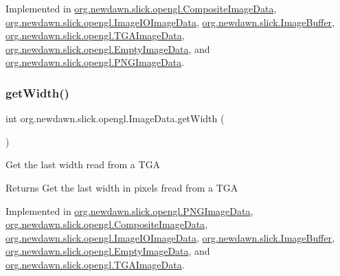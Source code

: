 Implemented in \mbox{\hyperlink{classorg_1_1newdawn_1_1slick_1_1opengl_1_1_composite_image_data_aa669973b504de478c91db03a0319b389}{org.\+newdawn.\+slick.\+opengl.\+Composite\+Image\+Data}}, \mbox{\hyperlink{classorg_1_1newdawn_1_1slick_1_1opengl_1_1_image_i_o_image_data_a54f08b337deb652cedaad3fe8dbe68da}{org.\+newdawn.\+slick.\+opengl.\+Image\+I\+O\+Image\+Data}}, \mbox{\hyperlink{classorg_1_1newdawn_1_1slick_1_1_image_buffer_a9691609c6c7e7776882af57cfd6daab9}{org.\+newdawn.\+slick.\+Image\+Buffer}}, \mbox{\hyperlink{classorg_1_1newdawn_1_1slick_1_1opengl_1_1_t_g_a_image_data_a4e4b19e2ec7982442fc5086cbf7f3a30}{org.\+newdawn.\+slick.\+opengl.\+T\+G\+A\+Image\+Data}}, \mbox{\hyperlink{classorg_1_1newdawn_1_1slick_1_1opengl_1_1_empty_image_data_ad261b00a724191075cff314442c14baa}{org.\+newdawn.\+slick.\+opengl.\+Empty\+Image\+Data}}, and \mbox{\hyperlink{classorg_1_1newdawn_1_1slick_1_1opengl_1_1_p_n_g_image_data_a11b46d2443b057d49f3e893fa9eca716}{org.\+newdawn.\+slick.\+opengl.\+P\+N\+G\+Image\+Data}}.

\mbox{\label{interfaceorg_1_1newdawn_1_1slick_1_1opengl_1_1_image_data_a59fd53f0ca1e501de35c1b2b4a7e69c5}} 
\subsubsection{\texorpdfstring{get\+Width()}{getWidth()}}
{\footnotesize\ttfamily int org.\+newdawn.\+slick.\+opengl.\+Image\+Data.\+get\+Width (\begin{DoxyParamCaption}{ }\end{DoxyParamCaption})}

Get the last width read from a T\+GA

\begin{DoxyReturn}{Returns}
Get the last width in pixels fread from a T\+GA 
\end{DoxyReturn}


Implemented in \mbox{\hyperlink{classorg_1_1newdawn_1_1slick_1_1opengl_1_1_p_n_g_image_data_a6f5520a374bf2ab19d08116c27017833}{org.\+newdawn.\+slick.\+opengl.\+P\+N\+G\+Image\+Data}}, \mbox{\hyperlink{classorg_1_1newdawn_1_1slick_1_1opengl_1_1_composite_image_data_afacb76ad47cbb2ce231c2f92ed87458c}{org.\+newdawn.\+slick.\+opengl.\+Composite\+Image\+Data}}, \mbox{\hyperlink{classorg_1_1newdawn_1_1slick_1_1opengl_1_1_image_i_o_image_data_accfdc9fa2f7b02f9291d996fa48a8f1f}{org.\+newdawn.\+slick.\+opengl.\+Image\+I\+O\+Image\+Data}}, \mbox{\hyperlink{classorg_1_1newdawn_1_1slick_1_1_image_buffer_a802e5461f8a85e80513ccb93da536082}{org.\+newdawn.\+slick.\+Image\+Buffer}}, \mbox{\hyperlink{classorg_1_1newdawn_1_1slick_1_1opengl_1_1_empty_image_data_af376226fa31451e5ebab8d5570ced40e}{org.\+newdawn.\+slick.\+opengl.\+Empty\+Image\+Data}}, and \mbox{\hyperlink{classorg_1_1newdawn_1_1slick_1_1opengl_1_1_t_g_a_image_data_af1fc952e1578b431cfc2662387d9e38c}{org.\+newdawn.\+slick.\+opengl.\+T\+G\+A\+Image\+Data}}.

